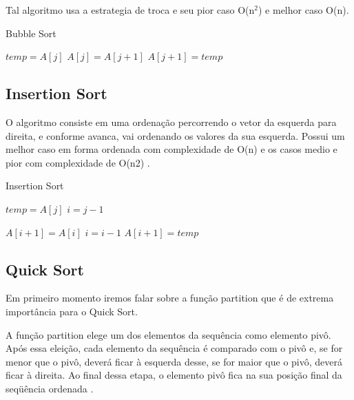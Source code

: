 \documentclass[12pt]{article}
\begin{document}
	Tal algoritmo usa a estrategia de troca e seu pior caso O(n$^2$) e melhor caso O(n).

	\begin{algorithm}[H]
		\caption{Bubble Sort}
		\begin{algorithmic}[1]
							\State $temp = A[j]$		
							\State $A[j] = A[j+1]$			
							\State $A[j+1] = temp$				
						\EndIf
					\EndFor						
				\EndFor				
			\EndFunction
			
			
		\end{algorithmic}
	\end{algorithm}	
	
\subsection{Insertion Sort}
	O algoritmo consiste em uma ordenação percorrendo o vetor da esquerda para direita, e conforme avanca, vai ordenando os valores da sua esquerda.  Possui um melhor caso em forma ordenada com complexidade de O(n) e os casos medio e pior com complexidade de O(n2) \cite{santoscomparacc}.


	\begin{algorithm}[H]
		\caption{Insertion Sort}
		\begin{algorithmic}[1]

					\State $temp = A[j]$	
					\State $i = j - 1$		
										
					\While{$ ( i > 0 ) $ \And $ ( A[i] > temp ) $} 
						\State$A[i + 1] = A[i]$
						\State$i = i - 1 $
					\EndWhile
					\State$A[i + 1] = temp$				
				\EndFor
				
				
			\EndFunction
			
			
		\end{algorithmic}
	\end{algorithm}




\subsection{Quick Sort}

	Em primeiro momento iremos falar sobre a função partition que é de extrema importância para o Quick Sort. 
	
	A  função partition elege  um  dos  elementos  da  sequência  como  elemento
pivô.   Após  essa eleição, cada elemento da sequência é comparado com o pivô e, se for menor que o pivô, deverá ficar à esquerda desse,  se for maior que o pivô,  deverá ficar à direita.   Ao final dessa etapa,  o elemento pivô fica na sua posição final da seqüência ordenada \cite{prado2005analise}. 
	
\end{document}
